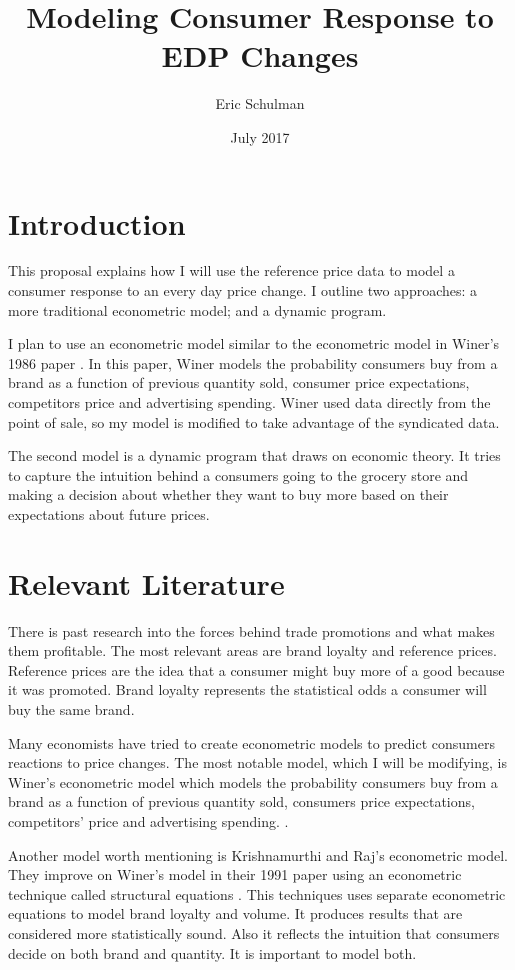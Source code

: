 \documentclass{article}
\title{Modeling Consumer Response to EDP Changes}
\author{Eric Schulman}
\date{July 2017}
\begin{document}
\maketitle

\section{Introduction}


This proposal explains how I will use the reference price data to model a consumer response to an every day price change. I outline two approaches: a more traditional econometric model; and a dynamic program.

I plan to use an econometric model similar to the econometric model in Winer's 1986 paper \cite{winer}. In this paper, Winer models the probability consumers buy from a brand as a function of previous quantity sold, consumer price expectations, competitors price and advertising spending. Winer used data directly from the point of sale, so my model is modified to take advantage of the syndicated data.

The second model is a dynamic program that draws on economic theory. It tries to capture the intuition behind a consumers going to the grocery store and making a decision about whether they want to buy more based on their expectations about future prices.


\section{Relevant Literature}

There is past research into the forces behind trade promotions and what makes them profitable. The most relevant areas are brand loyalty and reference prices. Reference prices are the idea that a consumer might buy more of a good because it was promoted. Brand loyalty represents the statistical odds a consumer will buy the same brand. 

Many economists have tried to create econometric models to predict consumers reactions to price changes. The most notable model, which I will be modifying, is Winer's econometric model which models the probability consumers buy from a brand as a function of previous quantity sold, consumers price expectations, competitors' price and advertising spending.  \cite{winer}.

Another model worth mentioning is Krishnamurthi and Raj's econometric model. They improve on Winer's model in their 1991 paper using an econometric technique called structural equations \cite{krishnamurthi}. This techniques uses separate econometric equations to model brand loyalty and volume. It produces results that are considered more statistically sound. Also it reflects the intuition that consumers decide on both brand and quantity. It is important to model both.
\end{document}
